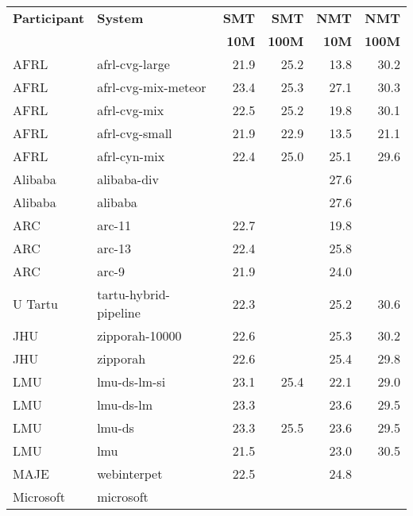 \begin{table*}
\begin{center}
\begin{tabular}{|l|l|r|r|r|r|} \hline
\bf Participant & \bf System & \bf SMT & \bf SMT & \bf NMT & \bf NMT \\
&& \bf 10M & \bf 100M & \bf 10M & \bf 100M \\ \hline
AFRL & afrl-cvg-large & 21.9 & 25.2 & 13.8 & 30.2 \\ \hline
AFRL & afrl-cvg-mix-meteor & 23.4 & 25.3 & 27.1 & 30.3 \\ \hline
AFRL & afrl-cvg-mix & 22.5 & 25.2 & 19.8 & 30.1 \\ \hline
AFRL & afrl-cvg-small & 21.9 & 22.9 & 13.5 & 21.1 \\ \hline
AFRL & afrl-cyn-mix & 22.4 & 25.0 & 25.1 & 29.6 \\ \hline
Alibaba & alibaba-div & \cellcolor{lightyellow}{24.1} & \cellcolor{lightgreen}{26.4} & 27.6 & \cellcolor{lightgreen}{31.9} \\ \hline
Alibaba & alibaba & \cellcolor{lightyellow}{24.1} & \cellcolor{lightgreen}{26.4} & 27.6 & \cellcolor{lightgreen}{31.9} \\ \hline
ARC & arc-11 & 22.7 & \cellcolor{lightgreen}{26.1} & 19.8 & \cellcolor{lightyellow}{31.3} \\ \hline
ARC & arc-13 & 22.4 & \cellcolor{lightgreen}{26.1} & 25.8 & \cellcolor{lightyellow}{31.3} \\ \hline
ARC & arc-9 & 21.9 & \cellcolor{lightyellow}{26.0} & 24.0 & \cellcolor{lightyellow}{31.3} \\ \hline
U Tartu & tartu-hybrid-pipeline & 22.3 & \cellcolor{lightyellow}{25.7} & 25.2 & 30.6 \\ \hline
JHU & zipporah-10000 & 22.6 & \cellcolor{lightyellow}{25.8} & 25.3 & 30.2 \\ \hline
JHU & zipporah & 22.6 & \cellcolor{lightyellow}{25.8} & 25.4 & 29.8 \\ \hline
LMU & lmu-ds-lm-si & 23.1 & 25.4 & 22.1 & 29.0 \\ \hline
LMU & lmu-ds-lm & 23.3 & \cellcolor{lightyellow}{25.6} & 23.6 & 29.5 \\ \hline
LMU & lmu-ds & 23.3 & 25.5 & 23.6 & 29.5 \\ \hline
LMU & lmu & 21.5 & \cellcolor{lightyellow}{25.6} & 23.0 & 30.5 \\ \hline
MAJE & webinterpet & 22.5 & \cellcolor{lightgreen}{26.1} & 24.8 & \cellcolor{lightyellow}{31.2} \\ \hline
Microsoft & microsoft & \cellcolor{lightgreen}{24.4} & \cellcolor{green}{26.5} & \cellcolor{green}{28.6} & \cellcolor{green}{32.1} \\ \hline

\end{tabular}
\end{center}
\end{table*}
